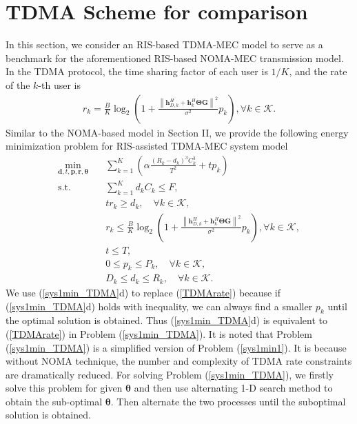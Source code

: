 \documentclass[journal]{IEEEtran}
\begin{document}
\section{TDMA Scheme for comparison}
In this section, we consider an RIS-based TDMA-MEC model to serve as a benchmark for the aforementioned RIS-based NOMA-MEC transmission model.
In the TDMA protocol, the time sharing factor of each user is $1/K$, and the rate of the $k$-th user is
{\begin{align}\label{TDMArate}
r_k = \frac{B}{K}\log_2\left( 1+ \frac{ \left\|\pmb h_{D,k}^H+\pmb h_{k}^H \pmb \Theta \pmb G\right\|^2}{\sigma^2}  {p_k} \right), \forall k\in \mathcal K.
\end{align}}
Similar to the NOMA-based model in Section II, we provide the following energy minimization problem for RIS-assisted TDMA-MEC system model
\begin{subequations}\label{sys1min_TDMA}
	\begin{align}
	\mathop{\min}_{\pmb d,  t, \pmb p, \pmb r, \pmb \theta}\quad
	&\sum_{k=1}^K (\alpha\frac{(R_{k}-d_{k})^3 C^3_{k}}{T^2}+tp_k)
	\\
	\textrm{s.t.}\quad
	& \sum_{k=1}^K d_{k} C_{k}\leq F,\\
	& tr_k\geq d_k, \quad \forall k\in\mathcal K,\\
    &{r_k \leq \frac{B}{K}\log_2\left( 1+ \frac{ \left\|\pmb h_{D,k}^H +\pmb h_{k}^H \pmb \Theta \pmb G\right\|^2}{\sigma^2}  {p_k} \right), \forall k\in\mathcal K},\\
	& t \leq T,\\
	& 0 \leq p_k \leq P_k,\quad \forall k\in\mathcal K,\\
	&  D_{k} \leq d_{k} \leq R_{k}, \quad \forall k\in\mathcal K.
	\end{align}
\end{subequations}
We use (\ref{sys1min_TDMA}d) to replace (\ref{TDMArate}) because if (\ref{sys1min_TDMA}d) holds with inequality, we can always find a smaller $p_k$ until the optimal solution is obtained. Thus (\ref{sys1min_TDMA}d) is equivalent to (\ref{TDMArate}) in Problem (\ref{sys1min_TDMA}).
It is noted that Problem (\ref{sys1min_TDMA}) is a simplified version of Problem (\ref{sys1min1}). It is because without NOMA technique, the number and complexity of TDMA rate constraints are dramatically reduced.
For solving Problem (\ref{sys1min_TDMA}), we firstly solve this problem for given $\pmb \theta$ and then use alternating 1-D search method to obtain the sub-optimal $\pmb \theta$. Then alternate the two processes until the suboptimal solution is obtained.
\end{document}
